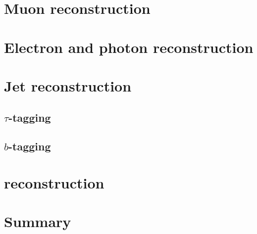 \section{Muon reconstruction}

\section{Electron and photon reconstruction}

\section{Jet reconstruction}

\subsection{$\tau$-tagging}

\subsection{$b$-tagging}

\section{\ptmiss reconstruction}

\section{Summary}